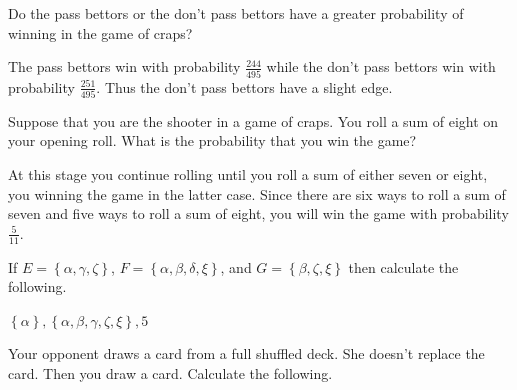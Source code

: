 \documentclass[answers,12pt]{exam}
\begin{document}
\begin{questions}
\question Do the pass bettors or the don't pass bettors have
a greater probability of winning in the game of craps?
\begin{solution} The pass bettors win with probability
$\frac{244}{495}$ while the don't pass bettors win with probability
$\frac{251}{495}$. Thus the don't pass bettors have a slight edge.
\end{solution}

\question Suppose that you are the shooter in a game of craps.
You roll a sum of eight on your opening
roll. What is the probability that you win the game?
\begin{solution} At this stage you continue rolling until
you roll a sum of either seven or eight, you winning the game
in the latter case. Since there are six ways to roll a sum of
seven and five ways to roll a sum of eight,
you will win the game with probability $\frac{5}{11}$.
\end{solution}

\question If $E=\left\{\alpha,\gamma,\zeta\right\}$,
$F=\left\{\alpha,\beta,\delta,\xi\right\}$, and
$G=\left\{\beta,\zeta,\xi\right\}$ then calculate the following.
\begin{solution} $\left\{\alpha\right\},\left\{
\alpha,\beta,\gamma,\zeta,\xi\right\},5$
\end{solution}

\question Your opponent draws a card from a full shuffled deck.
She doesn't replace the card.
Then you draw a card. Calculate the following.
\end{questions}
\end{document}
